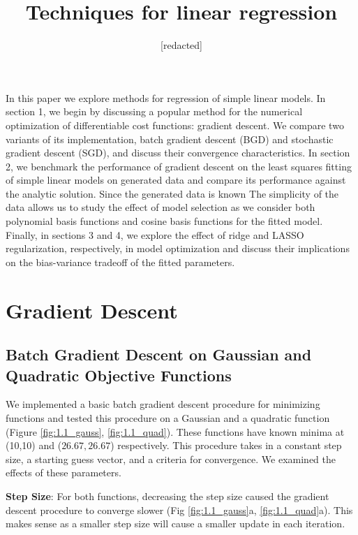 \documentclass[10pt, twocolumn]{article}
\begin{document}
 
\title{Techniques for linear regression}
\author{[redacted]}
\maketitle
 
In this paper we explore methods for regression of simple linear models. In section 1, we begin by discussing a popular method for the numerical optimization of differentiable cost functions: gradient descent. We compare two variants of its implementation, batch gradient descent (BGD) and stochastic gradient descent (SGD), and discuss their convergence characteristics. In section 2, we benchmark the performance of gradient descent on the least squares fitting of simple linear models on generated data and compare its performance against the analytic solution. Since the generated data is known The simplicity of the data allows us to study the effect of model selection as we consider both polynomial basis functions and cosine basis functions for the fitted model. Finally, in sections 3 and 4, we explore the effect of ridge and LASSO regularization, respectively, in model optimization and discuss their implications on the bias-variance tradeoff of the fitted parameters.

\section{Gradient Descent}

\subsection{Batch Gradient Descent on Gaussian and Quadratic Objective Functions}

We implemented a basic batch gradient descent procedure for minimizing functions and tested this procedure on a Gaussian and a quadratic function (Figure \ref{fig:1.1_gauss}, \ref{fig:1.1_quad}). These functions have known minima at (10,10) and ($26.67,26.67$) respectively. This procedure takes in a constant step size, a starting guess vector, and a criteria for convergence. We examined the effects of these parameters.
 
 \medskip

 \textbf{Step Size}: For both functions, decreasing the step size caused the gradient descent procedure to converge slower (Fig \ref{fig:1.1_gauss}a, \ref{fig:1.1_quad}a). This makes sense as a smaller step size will cause a smaller update in each iteration. 
 
\end{document}
